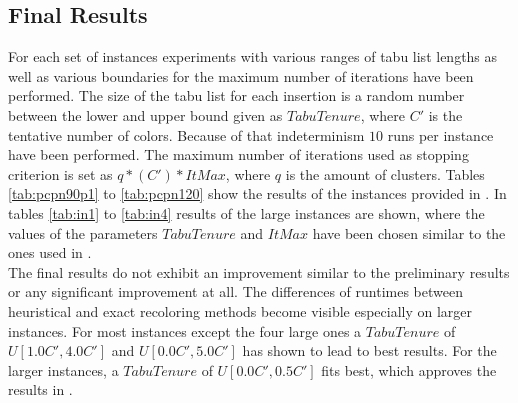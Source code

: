 \subsection{Final Results}
For each set of instances experiments with various ranges of tabu list lengths as well as various boundaries for the maximum number of iterations have been performed. The size of the tabu list for each insertion is a random number between the lower and upper bound given as $TabuTenure$, where $C'$ is the tentative number of colors. Because of that indeterminism $10$ runs per instance have been performed. The maximum number of iterations used as stopping criterion is set as $q*(C')*ItMax$, where $q$ is the amount of clusters. Tables \ref{tab:pcpn90p1} to \ref{tab:pcpn120} show the results of the instances provided in \cite{frota-07}. In tables \ref{tab:in1} to \ref{tab:in4} results of the large instances are shown, where the values of the parameters $TabuTenure$ and $ItMax$ have been chosen similar to the ones used in \cite{noronha-06}.\\
The final results do not exhibit an improvement similar to the preliminary results or any significant improvement at all. The differences of runtimes between heuristical and exact recoloring methods become visible especially on larger instances. For most instances except the four large ones a $TabuTenure$ of $U[1.0C',4.0C']$ and $U[0.0C',5.0C']$ has shown to lead to best results. For the larger instances, a $TabuTenure$ of $U[0.0C',0.5C']$ fits best, which approves the results in \cite{noronha-06}.

